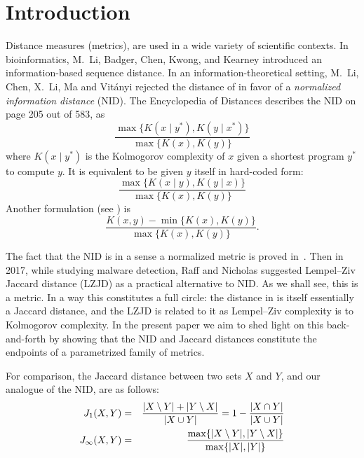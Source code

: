 \section{Introduction}
		Distance measures (metrics), are used in a wide variety of scientific contexts.
		In bioinformatics, M.~Li, Badger, Chen, Kwong, and Kearney \cite{Li2001AnIS} introduced an information-based sequence distance.
		In an information-theoretical setting, M.~Li, Chen, X.~Li, Ma and Vit{\'a}nyi \cite{MR2103495} rejected the distance of \cite{Li2001AnIS} in favor of a
		\emph{normalized information distance} (NID).
		The Encyclopedia of Distances \cite{MR3559482} describes the NID on page 205 out of 583, as
		\[
			\frac{
				\max\{
					K(x\mid y^*),K(y\mid x^*)
				\}
			}{
				\max\{
					K(x),K(y)
				\}
			}
		\]
		where $K(x\mid y^*)$ is the Kolmogorov complexity of $x$ given a shortest program $y^*$ to compute $y$.
		It is equivalent to be given $y$ itself in hard-coded form:
		\[
			\frac{
				\max\{
					K(x\mid y),K(y\mid x)
				\}
			}{
				\max\{
					K(x),K(y)
				\}
			}
		\]
		Another formulation (see \cite[page 8]{MR2103495}) is
		\[
			\frac{K(x,y)-\min\{K(x),K(y)\}}{\max\{K(x),K(y)\}}.
		\]

		The fact that the NID is in a sense a normalized metric is proved in~\cite{MR2103495}.
		Then in 2017, while studying malware detection, Raff and Nicholas \cite{Raff2017AnAT} suggested Lempel--Ziv Jaccard distance (LZJD) as a practical alternative to NID.
		As we shall see, this is a metric.
		In a way this constitutes a full circle: the distance in \cite{Li2001AnIS} is itself essentially a Jaccard distance,
		and the LZJD is related to it as Lempel--Ziv complexity is to Kolmogorov complexity.
		In the present paper we aim to shed light on this back-and-forth by showing that
		the NID and Jaccard distances constitute the endpoints of a parametrized family of metrics.


		For comparison, the Jaccard distance between two sets $X$ and $Y$, and our analogue of the NID, are as follows:
		\begin{eqnarray}
			J_1(X,Y)&=&\frac{\lvert X\setminus Y\rvert+\lvert Y\setminus X\rvert}{\lvert X\cup Y\rvert} = 1 - \frac{\lvert X\cap Y\rvert}{\lvert X\cup Y\rvert}\\
			J_{\infty}(X,Y)&=&\frac{\max\{\lvert X\setminus Y\rvert, \lvert Y\setminus X\rvert\}}{\max\{\lvert X\rvert,\lvert Y\rvert\}}\label{setNID}
		\end{eqnarray}

